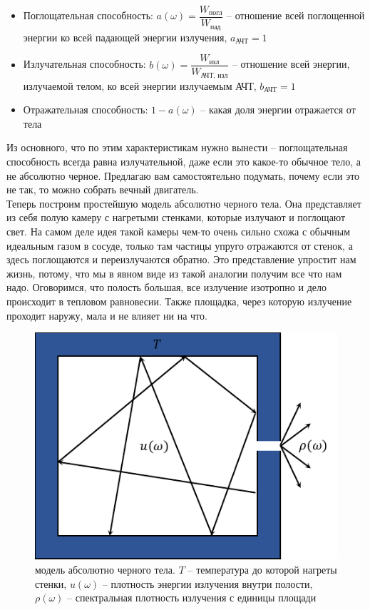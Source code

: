 \documentclass[12pt]{article}
\begin{document}
\begin{itemize}
    \item Поглощательная способность: $a(\omega) = \dfrac{W_{\text{погл}}}{W_{\text{пад}}}$ -- отношение всей поглощенной энергии ко всей падающей энергии излучения, $a_{\text{АЧТ}} = 1$
    \item Излучательная способность: $b(\omega) = \dfrac{W_{\text{изл}}}{W_{\text{АЧТ, изл}}}$ -- отношение всей энергии, излучаемой телом, ко всей энергии излучаемым АЧТ, $b_{\text{АЧТ}} = 1$
    \item Отражательная способность: $1 - a(\omega)$ -- какая доля энергии отражается от тела
\end{itemize}
Из основного, что по этим характеристикам нужно вынести -- поглощательная способность всегда равна излучательной, даже если это какое-то обычное тело, а не абсолютно черное. Предлагаю вам самостоятельно подумать, почему если это не так, то можно собрать вечный двигатель.
\\
Теперь построим простейшую модель абсолютно черного тела. Она представляет из себя полую камеру с нагретыми стенками, которые излучают и поглощают свет. На самом деле идея такой камеры чем-то очень сильно схожа с обычным идеальным газом в сосуде, только там частицы упруго отражаются от стенок, а здесь поглощаются и переизлучаются обратно. Это представление упростит нам жизнь, потому, что мы в явном виде из такой аналогии получим все что нам надо. Оговоримся, что полость большая, все излучение изотропно и дело происходит в тепловом равновесии. Также площадка, через которую излучение проходит наружу, мала и не влияет ни на что. 
\\
\begin{figure}[h]
    \centering
    \includegraphics[scale=1.5]{Seminar_01/pics/pic_02.pdf}
    \caption{модель абсолютно черного тела. $T$ -- температура до которой нагреты стенки, $u(\omega)$ -- плотность энергии излучения внутри полости, $\rho(\omega)$ -- спектральная плотность излучения с единицы площади}
    \label{fig:sem_01_abb_model}
\end{figure}
\end{document}
